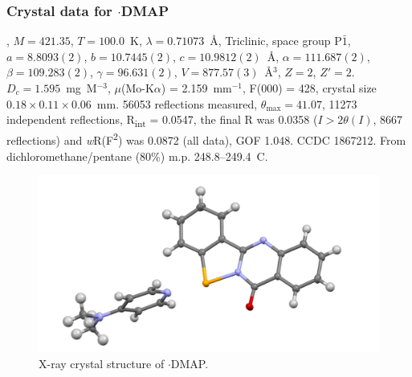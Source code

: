 \begin{refsection}
    \subsubsection{Crystal data for \texorpdfstring{$ \cdot $DMAP}{C21H18N4OSe}}
    , $M = 421.35$, $T=100.0$~K, $ \lambda=0.71073 $~\AA, Triclinic, space group P$\bar{1}$, $a = 8.8093(2)$, $b = 10.7445(2)$, $c = 10.9812(2)$~\AA, $\alpha = 111.687(2)$\degree, $\beta = 109.283(2)$\degree, $\gamma = 96.631(2)$\degree, $V = 877.57(3)$~\AA$^{3}$, $Z = 2$, $Z\prime = 2$.
    $D_{c}= 1.595$~mg~M$^{-3}$, $\mu$(Mo-K$\alpha$) = 2.159~mm$^{-1}$, F(000) = 428, crystal size $0.18 \times 0.11 \times 0.06$~mm.
    56053 reflections measured, $\theta_{\max} = 41.07$\degree, 11273 independent reflections, R\textsubscript{int} = 0.0547, the final R was 0.0358 ($I > 2\theta(I)$, 8667 reflections) and \textit{w}R(F\textsuperscript{2}) was 0.0872 (all data), GOF 1.048.
    CCDC 1867212.
    From dichloromethane/pentane (80\%) m.p. 248.8--249.4~\degree{}C.
    
    \begin{figure}
      \includegraphics[width=0.6\linewidth]{Figures/tetracycle-dmap-xtal.pdf}
      \caption{X-ray crystal structure of \texorpdfstring{$ \cdot $DMAP}{C21H18N4OSe}.}
    \end{figure}
    
    \printbibliography[heading=subbibliography]
    \end{refsection}
    